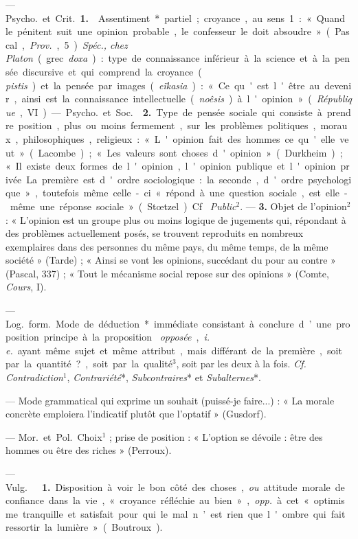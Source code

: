 \begin{itemize}[leftmargin=1cm, label=, itemsep=1pt]
 — \si{Psycho.} et \si{Crit.} {\bf 1.} 
Assentiment* partiel ; croyance, au sens 1 : « Quand le pénitent suit une
opinion probable, le confesseur le doit absoudre » (Pascal, {\it Prov.}, 5).
{\it Spéc., chez Platon} (grec {\it doxa}) : type de connaissance inférieur à
la science et à la pensée discursive et qui comprend la croyance ({\it
pistis}) et la pensée par images ({\it eïkasia}) : « Ce qu'est l'être au
devenir, ainsi est la connaissance intellectuelle ({\it noêsis}) à l'opinion
» ({\it République}, VI).

— \si{Psycho.} et \si{Soc.}  {\bf 2.} Type de
pensée sociale qui consiste à prendre position, plus ou moins fermement, sur
les problèmes politiques, moraux, philosophiques, religieux : « L'opinion
fait des hommes ce qu'elle veut » (Lacombe) ; « Les valeurs sont choses
d'opinion » (Durkheim) ; « Il existe deux formes de l'opinion, l'opinion
publique et l'opinion privée. La première est d'ordre sociologique: ... la
seconde, d'ordre psychologique », toutefois même celle-ci « répond à une
question sociale, est elle-même une réponse sociale » (Stœtzel). Cf. {\it
Public}$^2$. —  {\bf 3.} Objet de l'opinion$^2$ : « L'opinion
est un groupe plus ou moins logique de jugements qui, répondant à des
problèmes actuellement posés, se trouvent reproduits en nombreux exemplaires
dans des personnes du même pays, du même temps, de la même société
» (Tarde) ; « Ainsi se vont les opinions, succédant du pour au contre
» (Pascal, 337) ; « Tout le mécanisme social repose sur des opinions
» (Comte, {\it Cours}, I).

 — \si{Log.} \si{form.} Mode de déduction* immédiate
consistant à conclure d’une proposition principe à la proposition {\it
opposée}, {\it i. e.} ayant même sujet et même attribut, mais différant de la
première, soit par la quantité?, soit par la qualité$^3$, soit par les deux à
la fois. {\it Cf.} {\it Contradiction}$^1$, {\it Contrariété}*, {\it
Subcontraires}* et {\it Subalternes}*.

 — Mode grammatical qui exprime un souhait (puissé-je faire...) :
« La morale concrète emploiera l'indicatif plutôt que l’optatif » (Gusdorf).

 — \si{Mor.} et \si{Pol.} Choix$^1$ ; prise de position : «
L'option se dévoile : être des hommes ou être des riches » (Perroux).

 — \si{Vulg.}   {\bf 1.}
Disposition à voir le bon côté des choses, {\it ou} attitude morale de
confiance dans la vie, « croyance réfléchie au bien », {\it opp.} à cet «
optimisme tranquille et satisfait pour qui le mal n’est rien que l'ombre qui
fait ressortir la lumière » (Boutroux).


\end{itemize}
